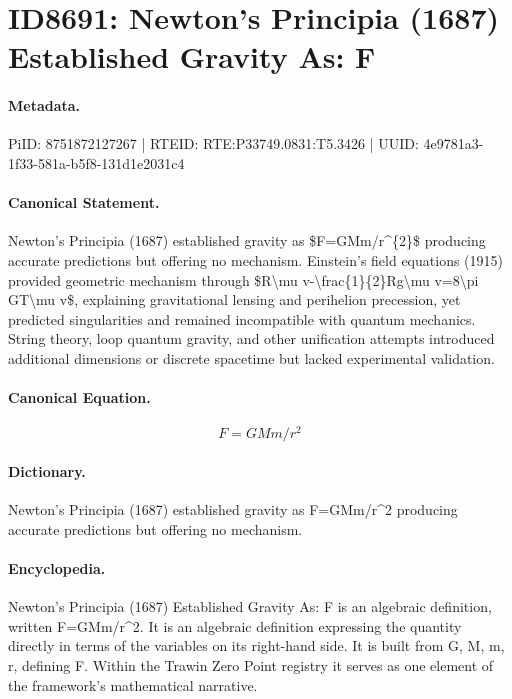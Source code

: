 \section*{ID8691: Newton's Principia (1687) Established Gravity As: F}
\paragraph{Metadata.}
PiID: 8751872127267 | RTEID: RTE:P33749.0831:T5.3426 | UUID: 4e9781a3-1f33-581a-b5f8-131d1e2031c4

\paragraph{Canonical Statement.}
Newton's Principia (1687) established gravity as \$F=GMm/r\textasciicircum{}\{2\}\$ producing accurate predictions but offering no mechanism. Einstein's field equations (1915) provided geometric mechanism through \$R\textbackslash{}mu v-\textbackslash{}frac\{1\}\{2\}Rg\textbackslash{}mu v=8\textbackslash{}pi GT\textbackslash{}mu v\$, explaining gravitational lensing and perihelion precession, yet predicted singularities and remained incompatible with quantum mechanics. String theory, loop quantum gravity, and other unification attempts introduced additional dimensions or discrete spacetime but lacked experimental validation.

\paragraph{Canonical Equation.}
\[
F=GMm/r^{2}
\]

\paragraph{Dictionary.}
Newton's Principia (1687) established gravity as F=GMm/r\textasciicircum{}2 producing accurate predictions but offering no mechanism.

\paragraph{Encyclopedia.}
Newton's Principia (1687) Established Gravity As: F is an algebraic definition, written F=GMm/r\textasciicircum{}2. It is an algebraic definition expressing the quantity directly in terms of the variables on its right-hand side. It is built from G, M, m, r, defining F. Within the Trawin Zero Point registry it serves as one element of the framework's mathematical narrative.
